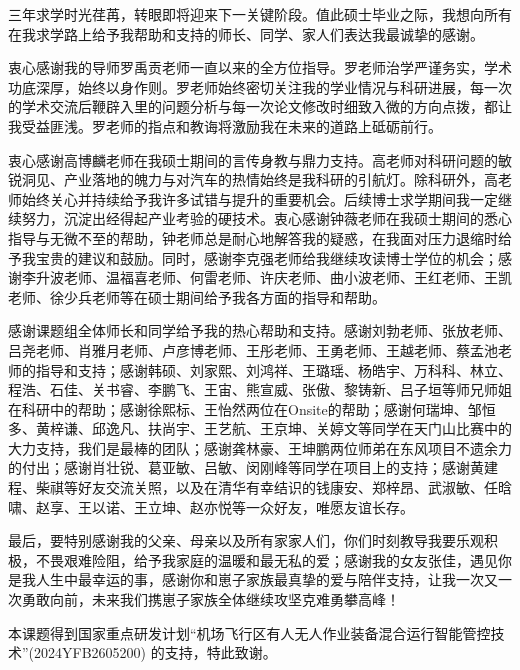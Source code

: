 
\begin{acknowledgements}
  三年求学时光荏苒，转眼即将迎来下一关键阶段。值此硕士毕业之际，我想向所有在我求学路上给予我帮助和支持的师长、同学、家人们表达我最诚挚的感谢。

  衷心感谢我的导师罗禹贡老师一直以来的全方位指导。罗老师治学严谨务实，学术功底深厚，始终以身作则。罗老师始终密切关注我的学业情况与科研进展，每一次的学术交流后鞭辟入里的问题分析与每一次论文修改时细致入微的方向点拨，都让我受益匪浅。罗老师的指点和教诲将激励我在未来的道路上砥砺前行。

  衷心感谢高博麟老师在我硕士期间的言传身教与鼎力支持。高老师对科研问题的敏锐洞见、产业落地的魄力与对汽车的热情始终是我科研的引航灯。除科研外，高老师始终关心并持续给予我许多试错与提升的重要机会。后续博士求学期间我一定继续努力，沉淀出经得起产业考验的硬技术。衷心感谢钟薇老师在我硕士期间的悉心指导与无微不至的帮助，钟老师总是耐心地解答我的疑惑，在我面对压力退缩时给予我宝贵的建议和鼓励。同时，感谢李克强老师给我继续攻读博士学位的机会；感谢李升波老师、温福喜老师、何雷老师、许庆老师、曲小波老师、王红老师、王凯老师、徐少兵老师等在硕士期间给予我各方面的指导和帮助。

  感谢课题组全体师长和同学给予我的热心帮助和支持。感谢刘勃老师、张放老师、吕尧老师、肖雅月老师、卢彦博老师、王彤老师、王勇老师、王越老师、蔡孟池老师的指导和支持；感谢韩硕、刘家熙、刘鸿祥、王璐瑶、杨皓宇、万科科、林立、程浩、石佳、关书睿、李鹏飞、王宙、熊宣威、张傲、黎铸新、吕子垣等师兄师姐在科研中的帮助；感谢徐熙标、王怡然两位在Onsite的帮助；感谢何瑞坤、邹恒多、黄梓谦、邱逸凡、扶尚宇、王艺航、王京坤、关婷文等同学在天门山比赛中的大力支持，我们是最棒的团队；感谢龚林豪、王坤鹏两位师弟在东风项目不遗余力的付出；感谢肖壮锐、葛亚敏、吕敏、闵刚峰等同学在项目上的支持；感谢黄建程、柴祺等好友交流关照，以及在清华有幸结识的钱康安、郑梓昂、武淑敏、任晗啸、赵享、王以诺、王立坤、赵亦悦等一众好友，唯愿友谊长存。

  最后，要特别感谢我的父亲、母亲以及所有家家人们，你们时刻教导我要乐观积极，不畏艰难险阻，给予我家庭的温暖和最无私的爱；感谢我的女友张佳，遇见你是我人生中最幸运的事，感谢你和崽子家族最真挚的爱与陪伴支持，让我一次又一次勇敢向前，未来我们携崽子家族全体继续攻坚克难勇攀高峰！

  本课题得到国家重点研发计划“机场飞行区有人无人作业装备混合运行智能管控技术”(2024YFB2605200) 的支持，特此致谢。

\end{acknowledgements}
